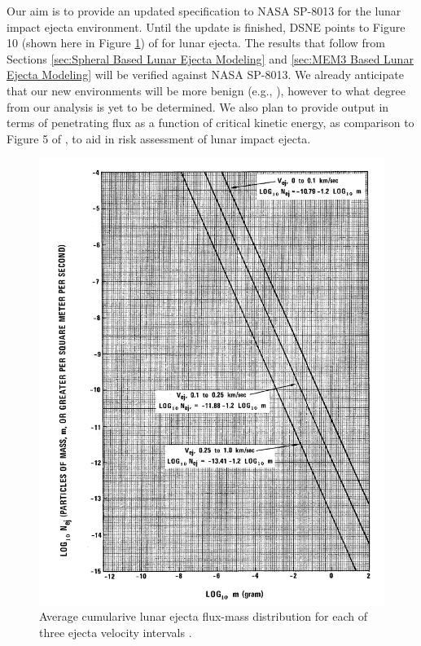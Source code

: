 \documentclass{hitec}
\begin{document}
Our aim is to provide an updated specification to NASA SP-8013 for the lunar impact ejecta environment. Until the update is finished, DSNE points to Figure 10 (shown here in Figure \ref{fig:NASA-SP-8013-Fig10-flux-mass-distribution}) of \cite{cour1969meteoroid} for lunar ejecta. The results that follow from Sections \ref{sec:Spheral Based Lunar Ejecta Modeling} and \ref{sec:MEM3 Based Lunar Ejecta Modeling} will be verified against NASA SP-8013. We already anticipate that our new environments will be more benign (e.g., \cite[][pointing out that $50$ J is the critial energy]{bjorkman2019astronaut}), however to what degree from our analysis is yet to be determined. We also plan to provide output in terms of penetrating flux as a function of critical kinetic energy, as comparison to Figure 5 of \cite{bjorkman2019astronaut}, to aid in risk assessment of lunar impact ejecta.

\begin{figure}[h!]
	\centering
	\includegraphics[scale=0.6]{NASA-SP-8013-Fig10-flux-mass-distribution.PNG}
	\caption{Average cumularive lunar ejecta flux-mass distribution for each of three ejecta velocity intervals \citep{cour1969meteoroid}.}\label{fig:NASA-SP-8013-Fig10-flux-mass-distribution}
\end{figure}
\end{document}

